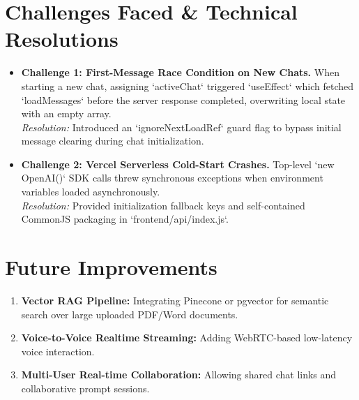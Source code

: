 \documentclass[11pt,a4paper]{article}
\begin{document}
\section{Challenges Faced \& Technical Resolutions}
\begin{itemize}[leftmargin=*]
  \item \textbf{Challenge 1: First-Message Race Condition on New Chats.} When starting a new chat, assigning `activeChat` triggered `useEffect` which fetched `loadMessages` before the server response completed, overwriting local state with an empty array. \\
  \textit{Resolution:} Introduced an `ignoreNextLoadRef` guard flag to bypass initial message clearing during chat initialization.
  \item \textbf{Challenge 2: Vercel Serverless Cold-Start Crashes.} Top-level `new OpenAI()` SDK calls threw synchronous exceptions when environment variables loaded asynchronously. \\
  \textit{Resolution:} Provided initialization fallback keys and self-contained CommonJS packaging in `frontend/api/index.js`.
\end{itemize}

\section{Future Improvements}
\begin{enumerate}[leftmargin=*]
  \item \textbf{Vector RAG Pipeline:} Integrating Pinecone or pgvector for semantic search over large uploaded PDF/Word documents.
  \item \textbf{Voice-to-Voice Realtime Streaming:} Adding WebRTC-based low-latency voice interaction.
  \item \textbf{Multi-User Real-time Collaboration:} Allowing shared chat links and collaborative prompt sessions.
\end{enumerate}
\end{document}
